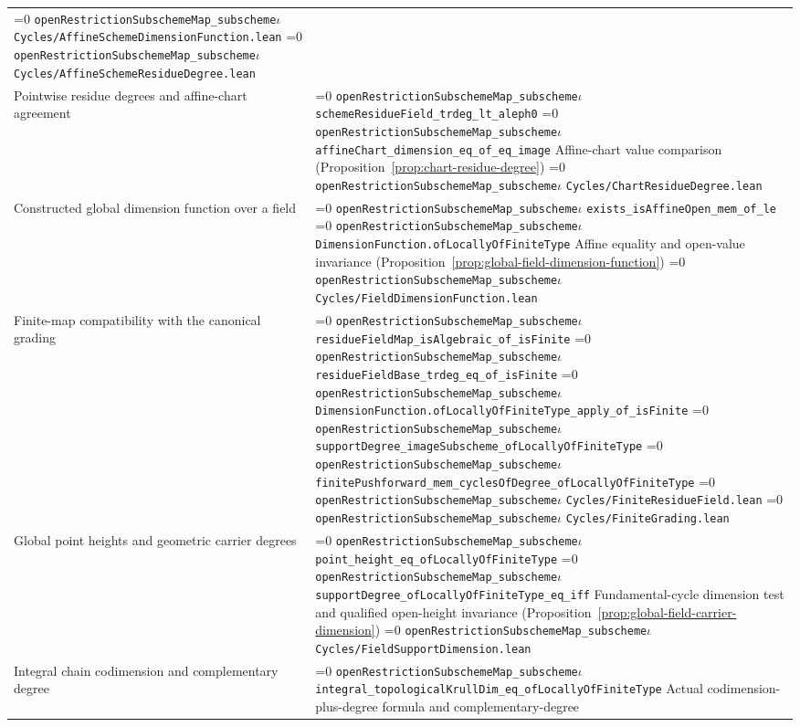 \documentclass[11pt]{article}
\theoremstyle{definition}
\theoremstyle{remark}
\newcommand{\leanpath}[1]{%
  \ifnum\pdfstrcmp{\detokenize{#1}}%
      {\detokenize{openRestrictionSubschemeMap_subschemeι}}=0
    \texttt{\nolinkurl{openRestrictionSubschemeMap_subscheme}}\ensuremath{\iota}%
  \else
    \texttt{\nolinkurl{#1}}%
  \fi}
\begin{document}
\begin{longtable}{@{}>{\raggedright\arraybackslash}p{}
                >{\raggedright\arraybackslash}p{}@{}}
\leanpath{Cycles/AffineSchemeDimensionFunction.lean}\newline
\leanpath{Cycles/AffineSchemeResidueDegree.lean}\\
Pointwise residue degrees and affine-chart agreement &
\leanpath{schemeResidueField_trdeg_lt_aleph0}\newline
\leanpath{affineChart_dimension_eq_of_eq_image}\newline
Affine-chart value comparison
(Proposition~\ref{prop:chart-residue-degree})\newline
\leanpath{Cycles/ChartResidueDegree.lean}\\
Constructed global dimension function over a field &
\leanpath{exists_isAffineOpen_mem_of_le}\newline
\leanpath{DimensionFunction.ofLocallyOfFiniteType}\newline
Affine equality and open-value invariance
(Proposition~\ref{prop:global-field-dimension-function})\newline
\leanpath{Cycles/FieldDimensionFunction.lean}\\
Finite-map compatibility with the canonical grading &
\leanpath{residueFieldMap_isAlgebraic_of_isFinite}\newline
\leanpath{residueFieldBase_trdeg_eq_of_isFinite}\newline
\leanpath{DimensionFunction.ofLocallyOfFiniteType_apply_of_isFinite}\newline
\leanpath{supportDegree_imageSubscheme_ofLocallyOfFiniteType}\newline
\leanpath{finitePushforward_mem_cyclesOfDegree_ofLocallyOfFiniteType}\newline
\leanpath{Cycles/FiniteResidueField.lean}\newline
\leanpath{Cycles/FiniteGrading.lean}\\
Global point heights and geometric carrier degrees &
\leanpath{point_height_eq_ofLocallyOfFiniteType}\newline
\leanpath{supportDegree_ofLocallyOfFiniteType_eq_iff}\newline
Fundamental-cycle dimension test and qualified open-height invariance
(Proposition~\ref{prop:global-field-carrier-dimension})\newline
\leanpath{Cycles/FieldSupportDimension.lean}\\
Integral chain codimension and complementary degree &
\leanpath{integral_topologicalKrullDim_eq_ofLocallyOfFiniteType}\newline
Actual codimension-plus-degree formula and complementary-degree

\end{longtable}
\end{document}
